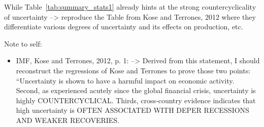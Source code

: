 \documentclass[a4paper,11pt,listof=nochaptergap,oneside,pointednumbers,bibtotoc,bigheadings,liststotoc]{scrbook}
\theoremstyle{mysatz}
\theoremstyle{mydefinition}
\theoremstyle{mybemerkung}
\begin{document}
While Table~\ref{tab:summary_stats1} already hints at the strong countercyclicality of uncertainty --> reproduce the Table from Kose and Terrones, 2012 where they differentiate various degrees of uncertainty and its effects on production, etc.


\begingroup
    \fontsize{8pt}{12pt}\selectfont
    Note to self:
\begin{itemize}
	\item IMF, Kose and Terrones, 2012, p. 1: --> Derived from this statement, I should reconstruct the regressions of Kose and Terrones to prove those two points: ``Uncertainty is shown to have a harmful impact on economic activity. Second, as experienced acutely since the global financial crisis, uncertainty is highly COUNTERCYCLICAL. Thirds, cross-country evidence indicates that high uncertainty is OFTEN ASSOCIATED WITH DEPER RECESSIONS AND WEAKER RECOVERIES. 
\end{itemize}
\endgroup
\end{document}

